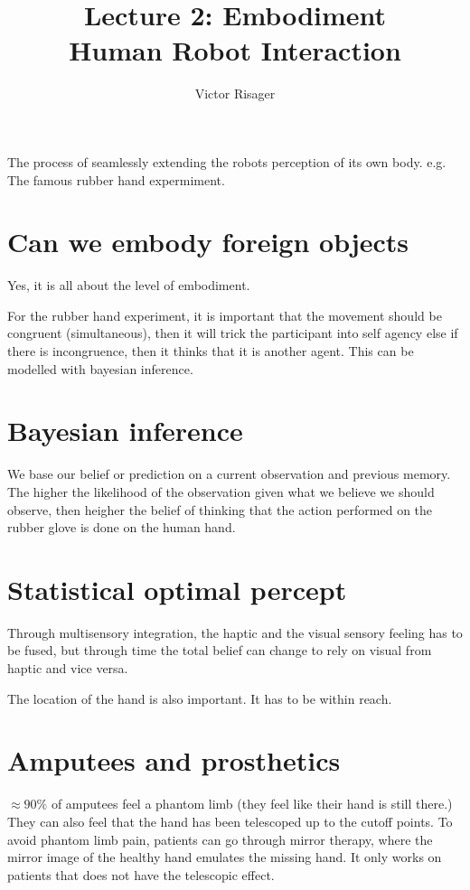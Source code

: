 \documentclass[a4paper]{article}
\title{Lecture 2: Embodiment  \\
	\large Human Robot Interaction}
\author{Victor Risager}
\begin{document}
\maketitle

The process of seamlessly extending the robots perception of its own body. e.g. The famous rubber hand expermiment.

\section{Can we embody foreign objects}
Yes, it is all about the level of embodiment. 

For the rubber hand experiment, it is important that the movement should be congruent (simultaneous), then it will trick the participant into self agency else if there is incongruence, then it thinks that it is another agent. This can be modelled with bayesian inference.

\section{Bayesian inference}
We base our belief or prediction on a current observation and  previous memory. The higher the likelihood of the observation given what we believe we should observe, then heigher the belief of thinking that the action performed on the rubber glove is done on the human hand.

\section{Statistical optimal percept}
Through multisensory integration, the haptic and the visual sensory feeling has to be fused, but through time the total belief can change to rely on visual from haptic and vice versa. 

The location of the hand is also important. It has to be within reach.

\section{Amputees and prosthetics}
$ \approx 90\%$ of amputees feel a phantom limb (they feel like their hand is still there.) They can also feel that the hand has been telescoped up to the cutoff points. To avoid phantom limb pain, patients can go through mirror therapy, where the mirror image of the healthy hand emulates the missing hand. It only works on patients that does not have the telescopic effect.  
\end{document}
